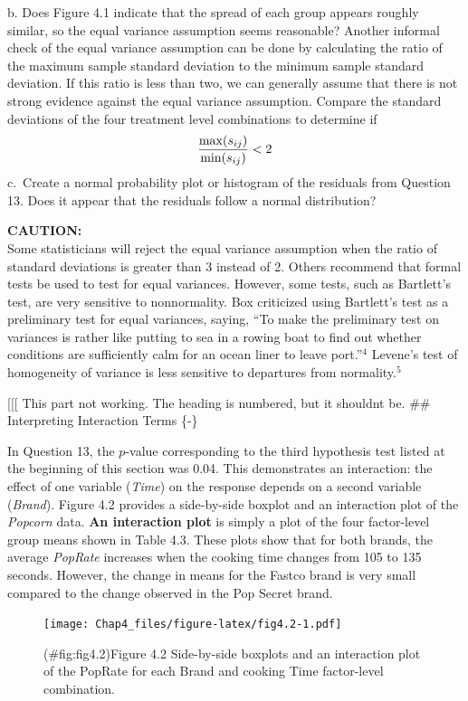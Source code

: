 \documentclass[
]{report}
\begin{document}
b. Does Figure 4.1 indicate that the spread of each group appears roughly similar, so the equal variance assumption seems reasonable? Another informal check of the equal variance assumption can be done by calculating the ratio of the maximum sample standard deviation to the minimum sample standard deviation. If this ratio is less than two, we can generally assume that there is not strong evidence against the equal variance assumption. Compare the standard deviations of the four treatment level combinations to determine if
\begin{align}
\frac{\max(s_{ij})}{\min(s_{ij})} < 2
\notag
\end{align}
c.~Create a normal probability plot or histogram of the residuals from Question 13. Does it appear that the residuals follow a normal distribution?

\large

\textbf{CAUTION:}\\
Some statisticians will reject the equal variance assumption when the ratio of standard deviations is greater than 3 instead of 2. Others recommend that formal tests be used to test for equal variances. However, some tests, such as Bartlett's test, are very sensitive to nonnormality. Box criticized using Bartlett's test as a preliminary test for equal variances, saying, ``To make the preliminary test on variances is rather like putting to sea in a rowing boat to find out whether conditions are sufficiently calm for an ocean liner to leave port.''\(^4\) Levene's test of homogeneity of variance is less sensitive to departures from normality.\(^5\)
\normalsize

{[}{[}{[} This part not working. The heading is numbered, but it shouldnt be.
\#\# Interpreting Interaction Terms \{-\}

In Question 13, the \(p\)-value corresponding to the third hypothesis test listed at the beginning of this section was 0.04. This demonstrates an interaction: the effect of one variable (\emph{Time}) on the response depends on a second variable (\emph{Brand}). Figure 4.2 provides a side-by-side boxplot and an interaction plot of the \emph{Popcorn} data. \textbf{An interaction plot} is simply a plot of the four factor-level group means shown in Table 4.3. These plots show that for both brands, the average \emph{PopRate} increases when the cooking time changes from 105 to 135 seconds. However, the change in means for the Fastco brand is very small compared to the change observed in the Pop Secret brand.

\begin{figure}
\centering
\texttt{[image: Chap4\_files/figure-latex/fig4.2-1.pdf]}
\caption{(\#fig:fig4.2)Figure 4.2 Side-by-side boxplots and an interaction plot of the PopRate for each Brand and cooking Time factor-level combination.}
\end{figure}
\end{document}
